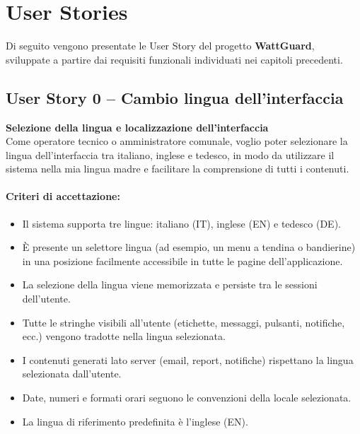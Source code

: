 \section{User Stories}
\label{chap:userStories}

Di seguito vengono presentate le User Story del progetto \textbf{WattGuard}, sviluppate a partire dai requisiti funzionali individuati nei capitoli precedenti.

\subsection{User Story 0 – Cambio lingua dell'interfaccia}
\label{us:cambioLingua}

\textbf{Selezione della lingua e localizzazione dell'interfaccia} \\
Come operatore tecnico o amministratore comunale, voglio poter selezionare la lingua dell'interfaccia tra italiano, inglese e tedesco, in modo da utilizzare il sistema nella mia lingua madre e facilitare la comprensione di tutti i contenuti.

\paragraph*{Criteri di accettazione:}
\begin{itemize}
    \item Il sistema supporta tre lingue: italiano (IT), inglese (EN) e tedesco (DE).
    \item È presente un selettore lingua (ad esempio, un menu a tendina o bandierine) in una posizione facilmente accessibile in tutte le pagine dell'applicazione.
    \item La selezione della lingua viene memorizzata e persiste tra le sessioni dell'utente.
    \item Tutte le stringhe visibili all'utente (etichette, messaggi, pulsanti, notifiche, ecc.) vengono tradotte nella lingua selezionata.
    \item I contenuti generati lato server (email, report, notifiche) rispettano la lingua selezionata dall'utente.
    \item Date, numeri e formati orari seguono le convenzioni della locale selezionata.
    \item La lingua di riferimento predefinita è l'inglese (EN).
\end{itemize}

